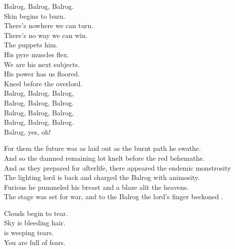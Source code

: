 Balrog, Balrog, Balrog. \\

Skin begins to burn. \\
There's nowhere we can turn. \\
There's no way we can win. \\
The  puppets him. \\

His pyre muscles flex. \\
We are his next subjects. \\
His power has us floored. \\
Kneel before the overlord. \\

Balrog, Balrog, Balrog, \\
Balrog, Balrog, Balrog. \\

Balrog, Balrog, Balrog, \\
Balrog, Balrog, Balrog. \\
Balrog, yes, oh! \\


For them the future was as laid out as the burnt path he swathe. \\
And so the damned remaining lot knelt before the red behemathe. \\

And as they prepared for afterlife, there appeared the endemic monstrosity \\
The lighting lord is back and charged the Balrog with animosity. \\

Furious he pummeled his breast and a blaze alit the heavens. \\
The stage was set for war, and to the Balrog the lord's finger beckoned . \\





Clouds begin to tear. \\
Sky is bleeding hair. \\
 is weeping tears. \\
You are full of fears. \\

